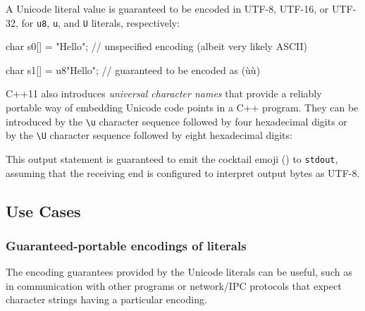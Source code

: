 \noindent A Unicode literal value is guaranteed to be encoded in UTF-8, UTF-16, or
UTF-32, for \lstinline!u8!, \lstinline!u!, and \lstinline!U! literals,
respectively:

\begin{emcppslisting}[language=C++]
char s0[] = "Hello";
    // unspecified encoding (albeit very likely ASCII)

char s1[] = u8"Hello";
    // guaranteed to be encoded as (ù{}ù)
\end{emcppslisting}
    
\noindent C++11 also introduces \emph{universal character names} that provide a
reliably portable way of embedding Unicode code points in a C++ program.
They can be introduced by the \lstinline!\u! character
sequence followed by four hexadecimal digits or by the
\lstinline!\U! character sequence followed by eight
hexadecimal digits:

\begin{emcppslisting}[language=C++]
#include <cstdio>  // (ù{ù)                                               
void f()                                                                        
{                                                                               
    std::puts(u8"\U0001F378"); // Unicode code point in a UTF8 encoded literal  
}
\end{emcppslisting}
    
\noindent This output statement is guaranteed to emit the cocktail emoji
(\martini) to \lstinline!stdout!, assuming that the receiving end is configured to
interpret output bytes as UTF-8.

\subsection[Use Cases]{Use Cases}\label{use-cases}

\subsubsection[Guaranteed-portable encodings of literals]{Guaranteed-portable encodings of literals}\label{guaranteed-portable-encodings-of-literals}

The encoding guarantees provided by the Unicode literals can be useful,
such as in communication with other programs or network/IPC protocols that
expect character strings having a particular encoding.


